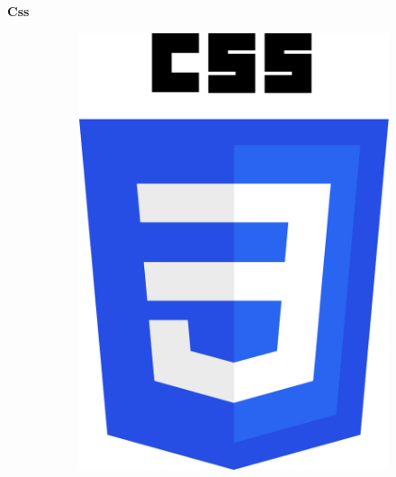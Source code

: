 \documentclass{article}
\begin{document}
\textbf{Css}
\newline
\begin{figure}[h!]
	\centering
  	\begin{subfigure}[b]{0.1\linewidth}
	\includegraphics[width=\linewidth]{css.png}
  	\end{subfigure}
\end{figure}
\end{document}
